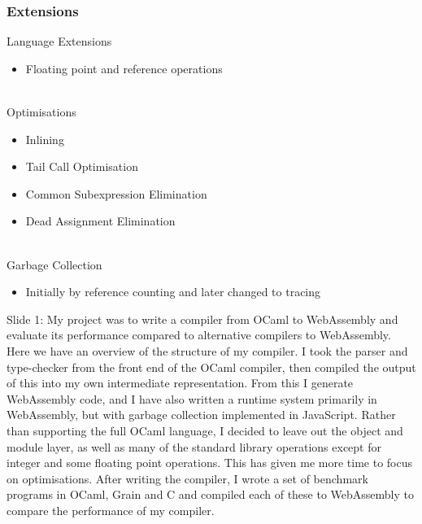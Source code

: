 \documentclass{beamer}
\begin{document}
\begin{frame}\frametitle{Extensions} 
Language Extensions
\begin{itemize}
\item Floating point and reference operations
\end{itemize}
\text{} \\
Optimisations
\begin{itemize}
\item Inlining %
\item Tail Call Optimisation %
\item Common Subexpression Elimination %
\item Dead Assignment Elimination %
\end{itemize}
\text{}\\
Garbage Collection
\begin{itemize}
\item Initially by reference counting and later changed to tracing
\end{itemize}
\end{frame}


\iffalse 

Slide 1: My project was to write a compiler from OCaml to WebAssembly and evaluate its performance compared to alternative compilers to WebAssembly.
Here we have an overview of the structure of my compiler. I took the parser and type-checker from the front end of the OCaml compiler, then compiled the output of this into my own intermediate representation. %
From this I generate WebAssembly code, and I have also written a runtime system primarily in WebAssembly, but with garbage collection implemented in JavaScript.
Rather than supporting the full OCaml language, I decided to leave out the object and module layer, as well as many of the standard library operations except for integer and some floating point operations. This has given me more time to focus on optimisations.
After writing the compiler, I wrote a set of benchmark programs in OCaml, Grain and C and compiled each of these to WebAssembly to compare the performance of my compiler. 
\end{document}
